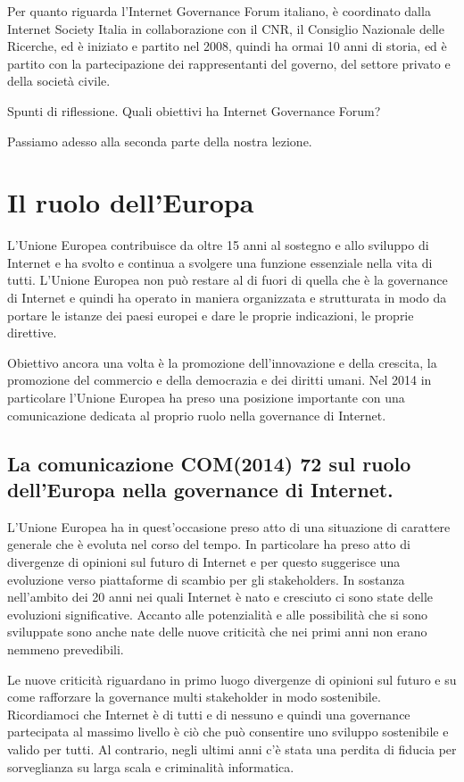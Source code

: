 Per quanto riguarda l'Internet Governance Forum italiano, è coordinato dalla Internet Society Italia in collaborazione con il CNR, il Consiglio Nazionale delle Ricerche, ed è iniziato e partito nel 2008, quindi ha ormai 10 anni di storia, ed è partito con la partecipazione dei rappresentanti del governo, del settore privato e della società civile.

Spunti di riflessione. Quali obiettivi ha Internet Governance Forum? \par
Passiamo adesso alla seconda parte della nostra lezione.

\section{Il ruolo dell'Europa}
L'Unione Europea contribuisce da oltre 15 anni al sostegno e allo sviluppo di Internet e ha svolto e continua a svolgere una funzione essenziale nella vita di tutti. L'Unione Europea non può restare al di fuori di quella che è la governance di Internet e quindi ha operato in maniera organizzata e strutturata in modo da portare le istanze dei paesi europei e dare le proprie indicazioni, le proprie direttive.

Obiettivo ancora una volta è la promozione dell'innovazione e della crescita, la promozione del commercio e della democrazia e dei diritti umani. Nel 2014 in particolare l'Unione Europea ha preso una posizione importante con una comunicazione dedicata al proprio ruolo nella governance di Internet.

\subsection{La comunicazione COM(2014) 72 sul ruolo dell'Europa nella governance di Internet.}
 
L'Unione Europea ha in quest'occasione preso atto di una situazione di carattere generale che è evoluta nel corso del tempo. In particolare ha preso atto di divergenze di opinioni sul futuro di Internet e per questo suggerisce una evoluzione verso piattaforme di scambio per gli stakeholders. In sostanza nell'ambito dei 20 anni nei quali Internet è nato e cresciuto ci sono state delle evoluzioni significative. Accanto alle potenzialità e alle possibilità che si sono sviluppate sono anche nate delle nuove criticità che nei primi anni non erano nemmeno prevedibili.

Le nuove  criticità riguardano in primo luogo divergenze di opinioni sul futuro e su come rafforzare la governance multi stakeholder in modo sostenibile. Ricordiamoci che Internet è di tutti e di nessuno e quindi una governance partecipata al massimo livello è ciò che può consentire uno sviluppo sostenibile e valido per tutti. Al contrario,  negli ultimi anni c'è stata una perdita di fiducia per sorveglianza su larga scala e criminalità informatica. 

